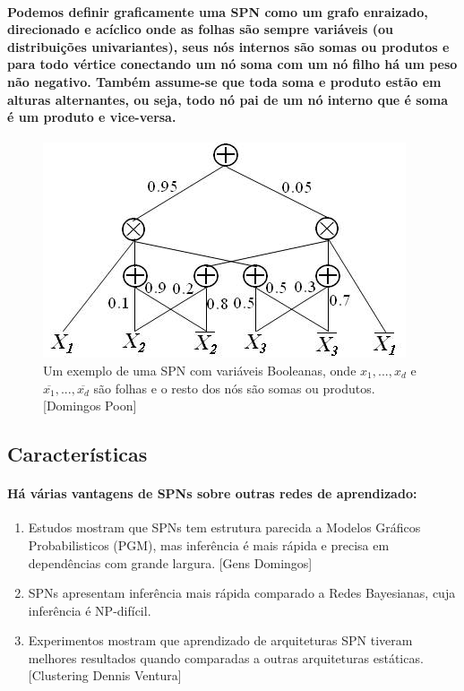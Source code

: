 \documentclass[a4paper,10pt]{article}
\theoremstyle{plain}
\begin{document}
\paragraph{
  Podemos definir graficamente uma SPN como um grafo enraizado, direcionado e acíclico onde as 
folhas são sempre variáveis (ou distribuições univariantes), seus nós internos são somas ou 
produtos e para todo vértice conectando um nó soma com um nó filho há um peso não negativo. 
Também assume-se que toda soma e produto estão em alturas alternantes, ou seja, todo nó pai 
de um nó interno que é soma é um produto e vice-versa.
}

\begin{figure}[h]
\centering\includegraphics[scale=0.7]{imgs/domingos_poon.jpg}
\caption{Um exemplo de uma SPN com variáveis Booleanas, onde $x_1,...,x_d$ e 
  $\overline{x_1},...,\overline{x_d}$ são folhas e o resto dos nós são somas ou produtos.
    [Domingos Poon]}
\end{figure}

\subsection{Características}

\paragraph{
  Há várias vantagens de SPNs sobre outras redes de aprendizado:
}

\begin{enumerate} \itemsep0pt
  \item Estudos mostram que SPNs tem estrutura parecida a Modelos Gráficos Probabilisticos (PGM), 
    mas inferência é mais rápida e precisa em dependências com grande largura. [Gens Domingos]
  \item SPNs apresentam inferência mais rápida comparado a Redes Bayesianas, cuja inferência é
    NP-difícil.
  \item Experimentos mostram que aprendizado de arquiteturas SPN tiveram melhores resultados quando
    comparadas a outras arquiteturas estáticas. [Clustering Dennis Ventura]
\end{enumerate}
\end{document}
